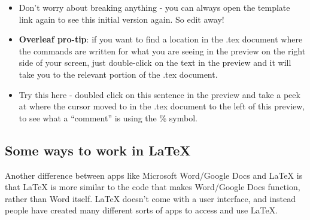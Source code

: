 \documentclass{article}
\begin{document}
\begin{itemize}

\item Don't worry about breaking anything - you can always open the template link again to see this initial version again. So edit away!


\item \textbf{Overleaf pro-tip}: if you want to find a location in the .tex document where the commands are written for what you are seeing in the preview on the right side of your screen, just double-click on the text in the preview and it will take you to the relevant portion of the .tex document.

\item Try this here - doubled click on this sentence in the preview and take a peek at where the cursor moved to in the .tex document to the left of this preview, to see what a ``comment'' is using the \% symbol. 



\end{itemize}

\subsection{Some ways to work in \LaTeX}

Another difference between apps like Microsoft Word/Google Docs and \LaTeX{} is that \LaTeX{} is more similar to the code that makes Word/Google Docs function, rather than Word itself. \LaTeX{} doesn't come with a user interface, and instead people have created many different sorts of apps to access and use \LaTeX. 
\end{document}
